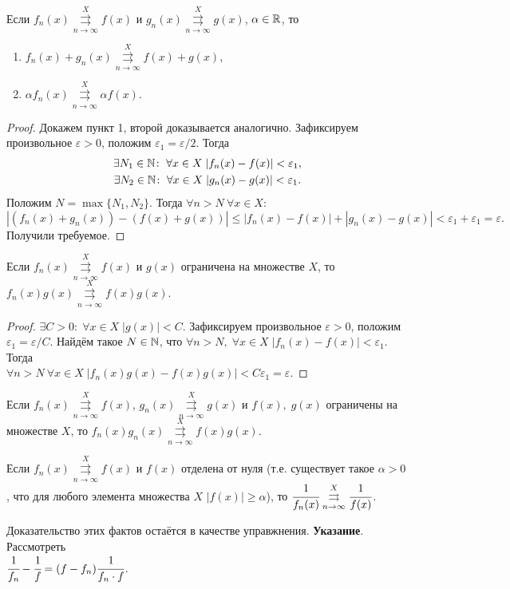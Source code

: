 \documentclass[a4paper, 12pt]{article}
\begin{document}
	\begin{Statement}
		Если $f_n(x) \overset{X}{\underset{n\to\infty}{\rightrightarrows}} f(x)$ и $g_n(x) \overset{X}{\underset{n\to\infty}{\rightrightarrows}} g(x)$, $\alpha \in \mathbb{R}$, то 
		\begin{enumerate}
			\item $f_n(x) + g_n(x) \overset{X}{\underset{n\to\infty}{\rightrightarrows}} f(x) + g(x)$,
			\item $\alpha f_n(x) \overset{X}{\underset{n\to\infty}{\rightrightarrows}} \alpha f(x)$.
		\end{enumerate}
	\end{Statement}
	\begin{proof}
		Докажем пункт 1, второй доказывается аналогично. Зафиксируем произвольное $\varepsilon > 0$, положим $\varepsilon_1 = \varepsilon / 2$. Тогда
		\begin{gather*}
			\exists N_1 \in \mathbb{N}\colon \; \forall x\in X\; |f_n(x) - f(x) | < \varepsilon_1,\\
			\exists N_2 \in \mathbb{N}\colon \; \forall x\in X\; |g_n(x) - g(x) | < \varepsilon_1.\\
		\end{gather*}
		Положим $N = \max\{N_1, N_2\}$. Тогда $\forall n > N\ \forall x \in X$:
		$$
			|(f_n(x) + g_n(x)) - (f(x) + g(x))| \leqslant |f_n(x) - f(x)| + |g_n(x) - g(x)| < \varepsilon_1 + \varepsilon_1 = \varepsilon.
		$$
		Получили требуемое.
	\end{proof}
	\begin{Statement}
		Если $f_n(x)\overset{X}{\underset{n\to\infty}{\rightrightarrows}} f(x)$ и $g(x)$ ограничена на множестве $X$, то\\ $f_n(x)g(x) \overset{X}{\underset{n\to\infty}{\rightrightarrows}} f(x) g(x)$.
	\end{Statement}
	\begin{proof}
		$\exists C>0\colon\; \forall x\in X\; |g(x)| < C$. Зафиксируем произвольное $\varepsilon > 0$, положим $\varepsilon_1 = \varepsilon/C$. Найдём такое $N\in \mathbb{N}$, что 
		$\forall n>N,\; \forall x\in X\; |f_n(x) - f(x)| < \varepsilon_1$. Тогда \\$\forall n >N\  \forall x\in X\; |f_n(x)g(x) - f(x)g(x)| < C\varepsilon_1 = \varepsilon$. 
	\end{proof}
	\begin{Comment}
		Если $f_n(x) \overset{X}{\underset{n\to\infty}{\rightrightarrows}} f(x)$, $g_n(x) \overset{X}{\underset{n\to\infty}{\rightrightarrows}} g(x)$ и $f(x),\; g(x)$ ограничены на множестве $X$, то $f_n(x)g_n(x)\overset{X}{\underset{n\to\infty}{\rightrightarrows}} f(x)g(x)$.
	\end{Comment}
	\begin{Comment}
		Если $f_n(x) \overset{X}{\underset{n\to\infty}{\rightrightarrows}} f(x)$ и $f(x)$ отделена от нуля (т.е. существует такое $\alpha>0$, что для любого элемента множества $X$ $|f(x)| \geqslant \alpha$), то $\cfrac{1}{f_n(x)} \overset{X}{\underset{n\to\infty}{\rightrightarrows}} \cfrac{1}{f(x)}$. 
	\end{Comment}
	Доказательство этих фактов остаётся в качестве управжнения. \textbf{Указание}. Рассмотреть \\$\cfrac{1}{f_n} - \cfrac{1}{f} = (f-f_n)\cfrac{1}{f_n\cdot f}$.
\end{document}
